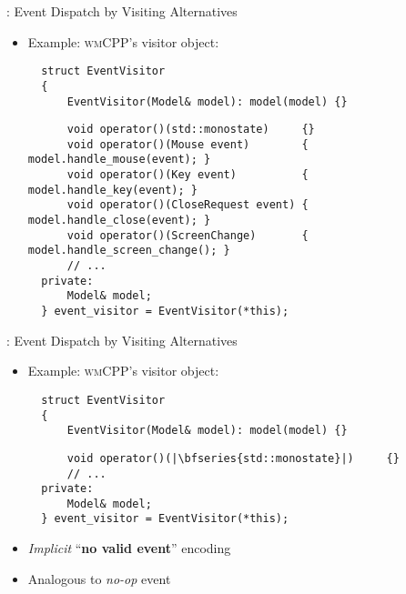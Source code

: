 \begin{frame}[fragile]{\underline{\cpp}: Event Dispatch by Visiting Alternatives \hfill {\footnotesize \currentname}}


    \begin{itemize}

        \item Example: \textsc{wmCPP}'s visitor object:\\
\begin{verbatim}
  struct EventVisitor
  {
      EventVisitor(Model& model): model(model) {}
\end{verbatim}
\begin{verbatim}
      void operator()(std::monostate)     {}
      void operator()(Mouse event)        { model.handle_mouse(event); }
      void operator()(Key event)          { model.handle_key(event); }
      void operator()(CloseRequest event) { model.handle_close(event); }
      void operator()(ScreenChange)       { model.handle_screen_change(); }
      // ...
  private:
      Model& model;
  } event_visitor = EventVisitor(*this);
\end{verbatim}


    \end{itemize}

    \vfill

\end{frame}

\begin{frame}[fragile]{\underline{\cpp}: Event Dispatch by Visiting Alternatives \hfill {\footnotesize \currentname}}


    \begin{itemize}

        \item Example: \textsc{wmCPP}'s visitor object:\\
\begin{verbatim}
  struct EventVisitor
  {
      EventVisitor(Model& model): model(model) {}
\end{verbatim}
\begin{verbatim}
      void operator()(|\bfseries{std::monostate}|)     {}
      // ...
  private:
      Model& model;
  } event_visitor = EventVisitor(*this);
\end{verbatim}

        \item \textit{Implicit} ``\textbf{no valid event}'' encoding

        \item Analogous to \textit{no-op} event

    \end{itemize}

    \vfill

\end{frame}

